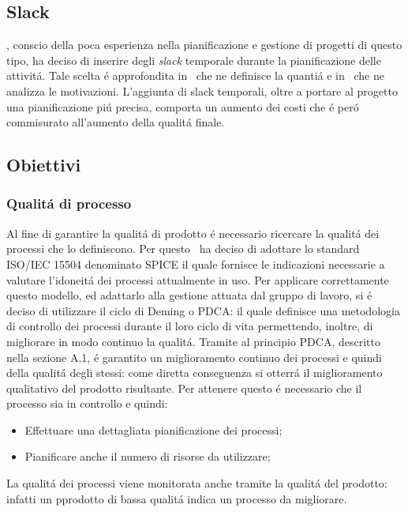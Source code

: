 \subsection{Slack}
\gruppo, conscio della poca esperienza nella pianificazione e gestione di progetti di questo tipo, ha deciso di inserire degli \textit{slack} temporale durante la pianificazione delle attivit\'a. Tale scelta \'e approfondita in \infoNDP ~che ne definisce la quanti\'a e in \infoPDP ~che ne analizza le motivazioni.
L'aggiunta di slack temporali, oltre a portare al progetto una pianificazione pi\'u precisa, comporta un aumento dei costi che \'e per\'o commisurato all'aumento della qualit\'a finale.
\subsection{Obiettivi}
\subsubsection{Qualit\'a di processo}
Al fine di garantire la qualit\'a di prodotto \'e necessario ricercare la qualit\'a dei processi che lo definiscono. Per questo \gruppo ~ha deciso di adottare lo standard ISO/IEC 15504 denominato SPICE il quale fornisce le indicazioni necessarie a valutare l'idoneit\'a dei processi attualmente in uso.
Per applicare correttamente questo modello, ed adattarlo alla gestione attuata dal gruppo di lavoro, si \'e deciso di utilizzare il ciclo di Deming o PDCA: il quale definisce una metodologia di controllo dei processi durante il loro ciclo di vita permettendo, inoltre, di migliorare in modo continuo la qualit\'a.
Tramite al principio PDCA, descritto nella sezione A.1, \'e garantito un miglioramento continuo dei processi e quindi della qualit\'a degli stessi: come diretta conseguenza si otterr\'a il miglioramento qualitativo del prodotto risultante.
Per attenere questo \'e necessario che il processo sia in controllo e quindi:
\begin{itemize}
\item Effettuare una dettagliata pianificazione dei processi;
\item Pianificare anche il numero di risorse da utilizzare;
\end{itemize}
La qualit\'a dei processi viene monitorata anche tramite la qualit\'a del prodotto: infatti un pprodotto di bassa qualit\'a indica un processo da migliorare.
